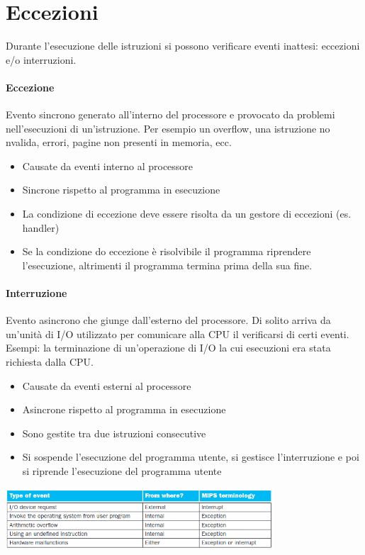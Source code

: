\documentclass[12pt, a4paper, openany]{book}
\begin{document}

\section{Eccezioni}
Durante l'esecuzione delle istruzioni si possono verificare eventi inattesi: eccezioni
e/o interruzioni.
\paragraph*{Eccezione} Evento sincrono generato all'interno del processore e provocato
da problemi nell'esecuzioni di un'istruzione. Per esempio un overflow, una istruzione
no nvalida, errori, pagine non presenti in memoria, ecc.
\begin{itemize}
    \item Causate da eventi interno al processore
    \item Sincrone rispetto al programma in esecuzione
    \item La condizione di eccezione deve essere risolta da un gestore di eccezioni (es. handler)
    \item Se la condizione do eccezione è risolvibile il programma riprendere l'esecuzione, altrimenti
    il programma termina prima della sua fine.
\end{itemize}

\paragraph*{Interruzione} Evento asincrono che giunge dall'esterno del processore.
Di solito arriva da un'unità di I/O utilizzato per comunicare alla CPU il verificarsi
di certi eventi.
Esempi: la terminazione di un'operazione di I/O la cui esecuzioni era stata richiesta dalla
CPU.
\begin{itemize}
    \item Causate da eventi esterni al processore
    \item Asincrone rispetto al programma in esecuzione
    \item Sono gestite tra due istruzioni consecutive
    \item Si sospende l'esecuzione del programma utente, si gestisce l'interruzione e poi
    si riprende l'esecuzione del programma utente
\end{itemize}

\begin{center}
    \includegraphics[width=100mm, scale=0.5]{Exception and interrupt.png}
\end{center}
\end{document}
